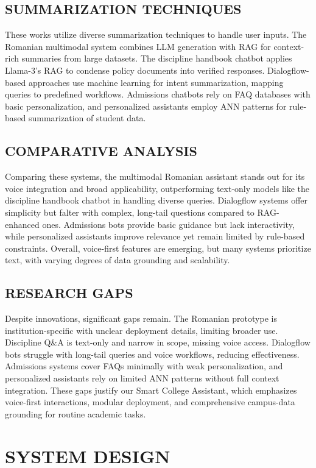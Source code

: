 \documentclass{article}
\begin{document}
\subsection{SUMMARIZATION TECHNIQUES}
These works utilize diverse summarization techniques to handle user inputs. The Romanian multimodal system combines LLM generation with RAG for context-rich summaries from large datasets. The discipline handbook chatbot applies Llama-3's RAG to condense policy documents into verified responses. Dialogflow-based approaches use machine learning for intent summarization, mapping queries to predefined workflows. Admissions chatbots rely on FAQ databases with basic personalization, and personalized assistants employ ANN patterns for rule-based summarization of student data.

\subsection{COMPARATIVE ANALYSIS}
Comparing these systems, the multimodal Romanian assistant stands out for its voice integration and broad applicability, outperforming text-only models like the discipline handbook chatbot in handling diverse queries. Dialogflow systems offer simplicity but falter with complex, long-tail questions compared to RAG-enhanced ones. Admissions bots provide basic guidance but lack interactivity, while personalized assistants improve relevance yet remain limited by rule-based constraints. Overall, voice-first features are emerging, but many systems prioritize text, with varying degrees of data grounding and scalability.

\subsection{RESEARCH GAPS}
Despite innovations, significant gaps remain. The Romanian prototype is institution-specific with unclear deployment details, limiting broader use. Discipline Q&A is text-only and narrow in scope, missing voice access. Dialogflow bots struggle with long-tail queries and voice workflows, reducing effectiveness. Admissions systems cover FAQs minimally with weak personalization, and personalized assistants rely on limited ANN patterns without full context integration. These gaps justify our Smart College Assistant, which emphasizes voice-first interactions, modular deployment, and comprehensive campus-data grounding for routine academic tasks.

\section{SYSTEM DESIGN}
\end{document}
